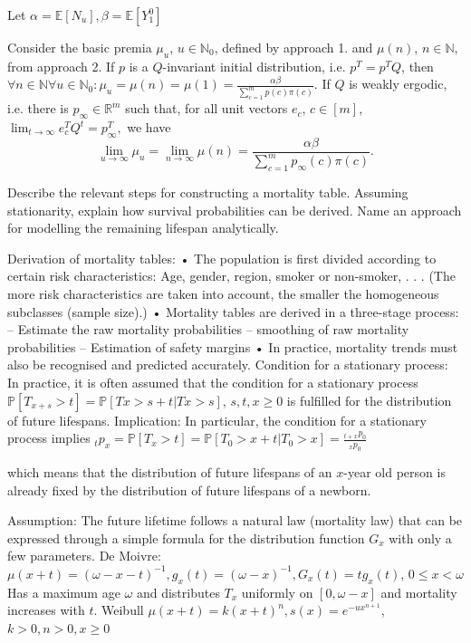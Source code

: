 Let \( \alpha = \mathbb{E}[N_u], \beta = \mathbb{E}[Y^{0}_1] \)

Consider the basic premia \(\mu_u\), \(u \in \mathbb{N}_0\), defined by approach 1. and \(\mu(n)\), \(n \in \mathbb{N}\), from approach 2.
If \(p\) is a \(Q\)-invariant initial distribution, i.e. \(p^T = p^T Q\), then
\(
\forall n \in \mathbb{N} \forall u \in \mathbb{N}_0 : \mu_u = \mu(n) = \mu(1) = \frac{\alpha \beta}{\sum_{c=1}^m p(c) \pi(c)}.
\)
If \(Q\) is weakly ergodic, i.e. there is \(p_\infty \in \mathbb{R}^m\) such that, for all unit vectors \(e_c\), \(c \in [m]\),
\(
\lim_{t \to \infty} e_c^T Q^t = p_\infty^T,
\)
we have
\[
\lim_{u \to \infty} \mu_u = \lim_{n \to \infty} \mu(n) = \frac{\alpha \beta}{\sum_{c=1}^m p_\infty(c) \pi(c)}.
\]


Describe the relevant steps for constructing a mortality table. 
Assuming stationarity, explain how survival probabilities can be derived.
Name an approach for modelling the remaining lifespan analytically.

Derivation of mortality tables:
• The population is first divided according to certain risk characteristics: Age,
gender, region, smoker or non-smoker, . . . (The more risk characteristics are
taken into account, the smaller the homogeneous subclasses (sample size).)
• Mortality tables are derived in a three-stage process:
– Estimate the raw mortality probabilities
– smoothing of raw mortality probabilities
– Estimation of safety margins
• In practice, mortality trends must also be recognised and predicted accurately.
Condition for a stationary process: In practice, it is often assumed that the condition
for a stationary process
\( \mathbb{P}[T_{x+s} > t] = \mathbb{P}[Tx > s + t| Tx > s] \), \( s, t, x \geq 0 \)
is fulfilled for the distribution of future lifespans. 
Implication: In particular, the condition for a stationary process implies
\( {}_t p_x = \mathbb{P}[T_x > t] = \mathbb{P}[T_0 > x + t|T_0 > x] = \frac{{}_{t+x}p_0}{{}_{x} p_0} \)

which means that the distribution of future lifespans of an \( x \)-year old person is
already fixed by the distribution of future lifespans of a newborn.

Assumption: The future lifetime follows a natural law (mortality law) that can be
expressed through a simple formula for the distribution function \( G_x \) with only a few
parameters.
De Moivre:
\( \mu(x+t) = (\omega - x - t)^{-1}, g_x(t) = (\omega - x)^{-1}, G_x(t) = tg_x(t) \), \( 0 \leq x < \omega \)
Has a maximum age \( \omega \) and distributes \( T_x \) uniformly on \( [0, \omega-x] \) and mortality increases with \( t \).
Weibull
\( \mu(x+t) = k(x+t)^n, s(x) = e^{-ux^{n+1}} \), \( k > 0, n > 0, x \geq 0 \)

